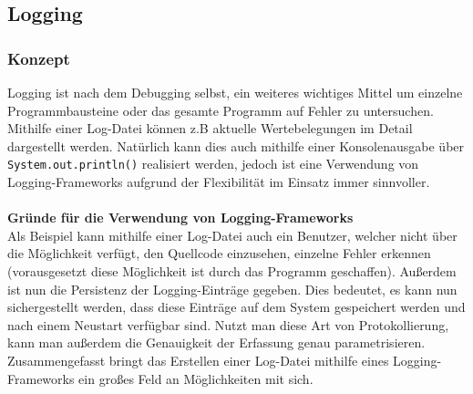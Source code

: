 \subsection{Logging}
\subsubsection{Konzept}\label{sssec:logOverview}
Logging ist nach dem Debugging selbst, ein weiteres wichtiges Mittel um einzelne Programmbausteine oder das gesamte Programm auf Fehler zu untersuchen.
Mithilfe einer Log-Datei können z.B aktuelle Wertebelegungen im Detail dargestellt werden.
Natürlich kann dies auch mithilfe einer Konsolenausgabe über \lstinline[style=java]{System.out.println()} realisiert werden, jedoch ist eine Verwendung von Logging-Frameworks aufgrund der Flexibilität im Einsatz immer sinnvoller.\\\\
\textbf{Gründe für die Verwendung von Logging-Frameworks}\\
Als Beispiel kann mithilfe einer Log-Datei auch ein Benutzer, welcher nicht über die Möglichkeit verfügt, den Quellcode einzusehen, einzelne Fehler erkennen (vorausgesetzt diese Möglichkeit ist durch das Programm geschaffen).
Außerdem ist nun die Persistenz der Logging-Einträge gegeben.
Dies bedeutet, es kann nun sichergestellt werden, dass diese Einträge auf dem System gespeichert werden und nach einem Neustart verfügbar sind.
Nutzt man diese Art von Protokollierung, kann man außerdem die Genauigkeit der Erfassung genau parametrisieren.\\
Zusammengefasst bringt das Erstellen einer Log-Datei mithilfe eines Logging-Frameworks ein großes Feld an Möglichkeiten mit sich.\\\\

